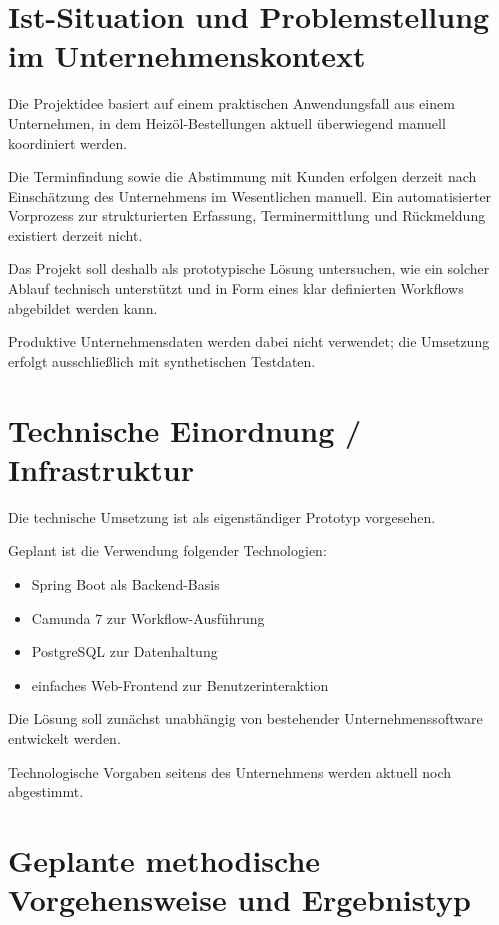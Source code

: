 \documentclass[12pt,a4paper]{article}
\begin{document}
	\section{Ist-Situation und Problemstellung im Unternehmenskontext}
	
	Die Projektidee basiert auf einem praktischen Anwendungsfall aus einem Unternehmen, in dem Heizöl-Bestellungen aktuell überwiegend manuell koordiniert werden.
	
	Die Terminfindung sowie die Abstimmung mit Kunden erfolgen derzeit nach Einschätzung des Unternehmens im Wesentlichen manuell. Ein automatisierter Vorprozess zur strukturierten Erfassung, Terminermittlung und Rückmeldung existiert derzeit nicht.
	
	Das Projekt soll deshalb als prototypische Lösung untersuchen, wie ein solcher Ablauf technisch unterstützt und in Form eines klar definierten Workflows abgebildet werden kann.
	
	Produktive Unternehmensdaten werden dabei nicht verwendet; die Umsetzung erfolgt ausschließlich mit synthetischen Testdaten.
	
	\section{Technische Einordnung / Infrastruktur}
	
	Die technische Umsetzung ist als eigenständiger Prototyp vorgesehen.
	
	Geplant ist die Verwendung folgender Technologien:
	
	\begin{itemize}[leftmargin=1.5cm]
		\item Spring Boot als Backend-Basis
		\item Camunda 7 zur Workflow-Ausführung
		\item PostgreSQL zur Datenhaltung
		\item einfaches Web-Frontend zur Benutzerinteraktion
	\end{itemize}
	
	Die Lösung soll zunächst unabhängig von bestehender Unternehmenssoftware entwickelt werden.
	
	Technologische Vorgaben seitens des Unternehmens werden aktuell noch abgestimmt.
	
	\section{Geplante methodische Vorgehensweise und Ergebnistyp}
	
\end{document}
